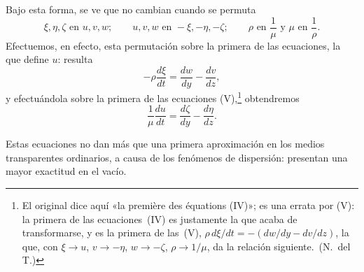 Bajo esta forma, se ve que no cambian cuando se permuta
\[
\xi,\eta,\zeta \text{ en } u,v,w;\qquad u,v,w \text{ en } -\xi,-\eta,-\zeta;
\qquad \rho \text{ en } \frac{1}{\mu}\text{ y } \mu \text{ en } \frac{1}{\rho}.
\]
Efectuemos, en efecto, esta permutación sobre la primera de las
ecuaciones, la que define $u$: resulta
\[
-\rho\frac{d\xi}{dt}=\frac{dw}{dy}-\frac{dv}{dz},
\]
y efectuándola sobre la primera de las ecuaciones (V),\footnote{El
original dice aquí «la première des équations (IV)»; es una errata por
(V): la primera de las ecuaciones~(IV) es justamente la que acaba de
transformarse, y es la primera de las~(V),
$\rho\,d\xi/dt=-(dw/dy-dv/dz)$, la que, con
$\xi\to u$, $v\to-\eta$, $w\to-\zeta$, $\rho\to 1/\mu$, da la relación
siguiente.~(N.~del T.)} obtendremos
\[
\frac{1}{\mu}\frac{du}{dt}=\frac{d\zeta}{dy}-\frac{d\eta}{dz}.
\]

Estas ecuaciones no dan más que una primera aproximación en los medios
transparentes ordinarios, a causa de los fenómenos de dispersión: presentan
una mayor exactitud en el vacío.

